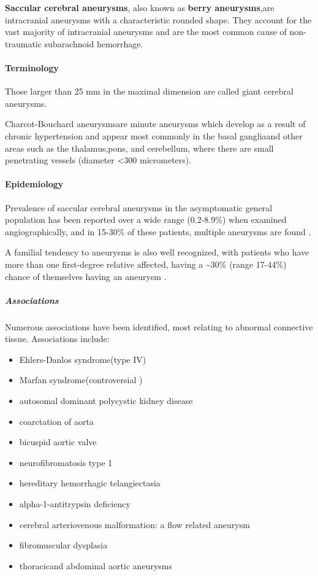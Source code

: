 \textbf{Saccular cerebral aneurysms}, also known as \textbf{berry aneurysms},are intracranial aneurysms with a characteristic rounded shape. They account for the vast majority of intracranial aneurysms and are the most common cause of non-traumatic subarachnoid hemorrhage.

\paragraph{Terminology}

Those larger than 25 mm in the maximal dimension are called giant cerebral aneurysms.

Charcot-Bouchard aneurysmsare minute aneurysms which develop as a result of chronic hypertension and appear most commonly in the basal gangliaand other areas such as the thalamus,pons, and cerebellum, where there are small penetrating vessels (diameter \textless300 micrometers).

\paragraph{Epidemiology}

Prevalence of saccular cerebral aneurysms in the asymptomatic general population has been reported over a wide range (0.2-8.9\%) when examined angiographically, and in 15-30\% of these patients, multiple aneurysms are found .

A familial tendency to aneurysms is also well recognized, with patients who have more than one first-degree relative affected, having a \textasciitilde30\% (range 17-44\%) chance of themselves having an aneurysm .

\subparagraph{Associations}

Numerous associations have been identified, most relating to abnormal connective tissue. Associations include:

\begin{itemize}
	\item
	Ehlers-Danlos syndrome(type IV)
	\item
	Marfan syndrome(controversial )
	\item
	autosomal dominant polycystic kidney disease
	\item
	coarctation of aorta
	\item
	bicuspid aortic valve
	\item
	neurofibromatosis type 1
	\item
	hereditary hemorrhagic telangiectasia
	\item
	alpha-1-antitrypsin deficiency
	\item
	cerebral arteriovenous malformation: a flow related aneurysm
	\item
	fibromuscular dysplasia
	\item
	thoracicand abdominal aortic aneurysms
\end{itemize}

